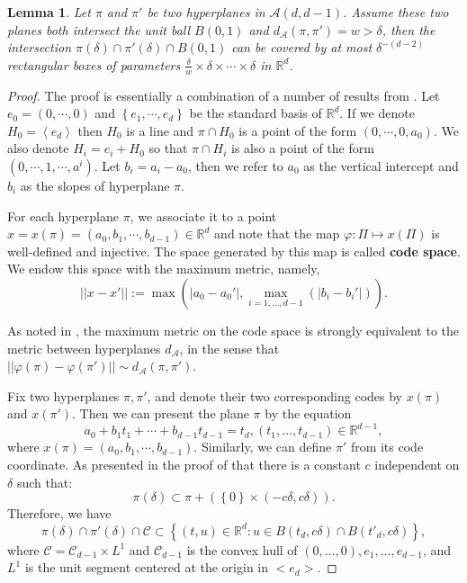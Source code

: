 \documentclass[11pt]{article}
\newtheorem{lemma}[theorem]{Lemma}
\newcommand{\1}{\mathbf{1}}
\begin{document}
\begin{lemma}\label{4.1}
    Let $\pi$ and $\pi'$ be two hyperplanes in $\mathcal{A}(d, d-1)$. Assume these two planes both intersect the unit ball $B(0, 1)$ and $d_\mathcal{A}(\pi, \pi')=w>\delta$, then the intersection $\pi(\delta)\cap \pi'(\delta)\cap B(0, 1)$ can be covered by at most $\delta^{-(d-2)}$ rectangular boxes of parameters $\frac{\delta}{w}\times \delta\times \cdots\times \delta$ in $\mathbb{R}^d$.
\end{lemma}
\begin{proof}
    The proof is essentially a combination of a number of results from \cite{HKM}. Let $e_0=(0, \cdots, 0)$ and $\left\{ e_1,\cdots,e_d\right\}$ be the standard basis of $\mathbb{R}^d$. If we denote $H_0=\left\langle e_d \right\rangle$ then $H_0$ is a line and $\pi \cap H_0$ is a point of the form $(0,\cdots,0,a_0)$. We also denote $H_i = e_i+H_0$ so that $\pi \cap H_i$ is also a point of the form $(0,\cdots,1,\cdots,a^i)$. Let $b_i=a_i-a_0$, then we refer to $a_0$ as the vertical intercept and $b_i$ as the slopes of hyperplane $\pi$.

    For each hyperplane $\pi$, we associate it to a point $x = x(\pi) = (a_0,b_1,\cdots,b_{d-1}) \in \mathbb{R}^d$ and note that the map $\varphi\colon \Pi \mapsto x(\Pi)$ is well-defined and injective. The space generated by this map is called \textbf{code space}. We endow this space with the maximum metric, namely,
    \[||x-x'||:=\max \left(|a_0-a_0'|, \max_{i=1, \ldots, d-1}\left(|b_i-b_i'|\right)\right).\]

    As noted in \cite[Remark 4.2]{HKM}, the maximum metric on the code space is strongly equivalent to the metric between hyperplanes $d_\mathcal{A}$, in the sense that $||\varphi(\pi)-\varphi(\pi')||\sim d_{\mathcal{A}}(\pi, \pi')$.

    Fix two hyperplanes $\pi, \pi' $, and denote their two corresponding codes by $x(\pi)$ and $x(\pi')$. Then we can present the plane $\pi$ by the equation
    \[a_0+b_1t_1+\cdots+b_{d-1}t_{d-1}=t_d, (t_1, \ldots, t_{d-1})\in \mathbb{R}^{d-1},\]
    where $x(\pi) = (a_0,b_1,\cdots,b_{d-1})$. Similarly, we can define $\pi'$ from its code coordinate. As presented in the proof of \cite[Lemma 4.3]{HKM} that there is a constant $c$ independent on $\delta$ such that:
    \[\pi(\delta) \subset \pi +(\left\lbrace 0 \right\rbrace \times (-c\delta,c\delta)).\]
    Therefore, we have
    \[ \pi(\delta) \cap \pi'(\delta) \cap \mathcal{C} \subset \left\lbrace (t,u) \in \mathbb{R}^d: u \in B(t_d,c\delta) \cap B(t'_d,c\delta)\right\rbrace, \]
    where $\mathcal{C}=\mathcal{C}_{d-1}\times L^1$ and $\mathcal{C}_{d-1}$ is the convex hull of $(0, \ldots, 0), e_1, \ldots, e_{d-1}$, and $L^1$ is the unit segment centered at the origin in $<e_d>$.


\end{proof}
\end{document}
